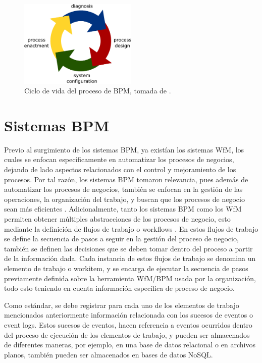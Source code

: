 \begin{figure}[htbp!] 
    \centering    
    \includegraphics[width=0.5\textwidth]{Chapter1/Figs/Vector/Figure_lifecycle.eps}
    \caption[Ciclo de vida del proceso de BPM]{Ciclo de vida del proceso de BPM, tomada de \cite[Fig.~2]{VanderAalst2004}.}
    \label{fig:CicloVida}
\end{figure}

\section{Sistemas BPM} %
\label{section1.2}

Previo al surgimiento de los sistemas BPM, ya existían los sistemas WfM, los cuales se enfocan específicamente en automatizar los procesos de negocios, dejando de lado aspectos relacionados con el control y mejoramiento de los procesos. Por tal razón, los sistemas BPM tomaron relevancia, pues además de automatizar los procesos de negocios, también se enfocan en la gestión de las operaciones, la organización del trabajo, y buscan que los procesos de negocio sean más eficientes \cite{VanderAalst2013,VanderAalst2016}. Adicionalmente, tanto los sistemas BPM como los WfM permiten obtener múltiples abstracciones de los procesos de negocio, esto mediante la definición de flujos de trabajo o workflows \cite{VanderAalst2004}. En estos flujos de trabajo se define la secuencia de pasos a seguir en la gestión del proceso de negocio, también se definen las decisiones que se deben tomar dentro del proceso a partir de la información dada. Cada instancia de estos flujos de trabajo se denomina un elemento de trabajo o workitem, y se encarga de ejecutar la secuencia de pasos previamente definida sobre la herramienta WfM/BPM usada por la organización, todo esto teniendo en cuenta información específica de proceso de negocio. 

Como estándar, se debe registrar para cada uno de los elementos de trabajo mencionados anteriormente información relacionada con los sucesos de eventos o event logs. Estos sucesos de eventos, hacen referencia a eventos ocurridos dentro del proceso de ejecución de los elementos de trabajo, y pueden ser almacenados de diferentes maneras, por ejemplo, en una base de datos relacional o en archivos planos, también pueden ser almacenados en bases de datos NoSQL. 

